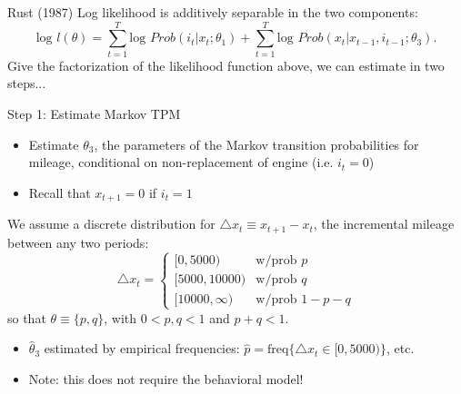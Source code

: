 \documentclass[xcolor=pdftex,dvipsnames,table,mathserif]{beamer}
\begin{document}
\begin{frame}{Rust (1987)}
Log likelihood is additively separable in the two components:
\begin{equation*}
\text{log } l(\theta) = \sum^T_{t=1} \text{log } Prob (i_t | x_t ; \theta_1) + \sum^T_{t=1} \text{log } Prob (x_t | x_{t-1}, i_{t-1}; \theta_3).
\end{equation*}
Give the factorization of the likelihood function above, we can estimate in two steps... \\
\vspace{3mm}
\end{frame}

\begin{frame}{Step 1: Estimate Markov TPM}
\begin{itemize}
\item Estimate $\theta_3$, the parameters of the Markov transition probabilities for mileage, conditional on non-replacement of engine (i.e. $i_t = 0$)
\item Recall that $x_{t+1} = 0$ if $i_t = 1$
\end{itemize}

We assume a discrete distribution for $\triangle x_t \equiv x_{t+1} - x_t$, the incremental mileage between any two periods:
\begin{equation*}
\triangle x_t = \left \{ 
\begin{matrix}
[0, 5000) & \text{w/prob } p \\
[5000, 10000) & \text{w/prob } q \\
[10000, \infty) & \text{w/prob } 1 - p - q  
\end{matrix}
\right .
\end{equation*}
so that $\theta \equiv \{p, q \}$, with $0 < p, q< 1$ and $p + q < 1$. \\
\vspace{2mm}
\begin{itemize}
\item $\hat \theta_3$ estimated by empirical frequencies: $\hat p = \text{freq} \{ \triangle x_t \in  [0, 5000) \}$, etc. 
\item Note: this does not require the behavioral model!
\end{itemize}
\end{frame}
\end{document}
